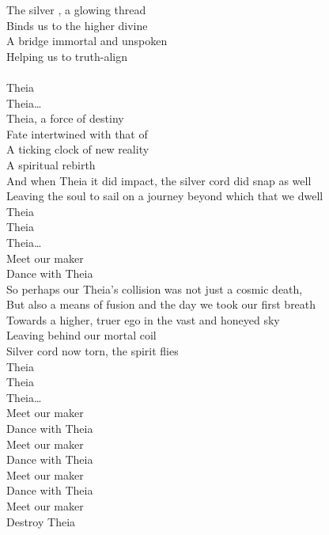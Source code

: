 \label{album:the-silver-cord}



The silver , a glowing thread \\
Binds us to the higher divine \\
A bridge immortal and unspoken \\
Helping us to truth-align \\

 \\
Theia \\
Theia… \\

Theia, a force of destiny \\
Fate intertwined with that of  \\
A ticking clock of new reality \\
A spiritual rebirth \\
And when Theia it did impact, the silver cord did snap as well \\
Leaving the soul to sail on a journey beyond which that we dwell \\

Theia \\
Theia \\
Theia… \\

Meet our maker \\
Dance with Theia \\

So perhaps our Theia's collision was not just a cosmic death, \\
But also a means of fusion and the day we took our first breath \\
Towards a higher, truer ego in the vast and honeyed sky \\
Leaving behind our mortal coil \\
Silver cord now torn, the spirit flies \\

Theia \\
Theia \\
Theia… \\

Meet our maker \\
Dance with Theia \\
Meet our maker \\
Dance with Theia \\
Meet our maker \\
Dance with Theia \\
Meet our maker \\
Destroy Theia \\

